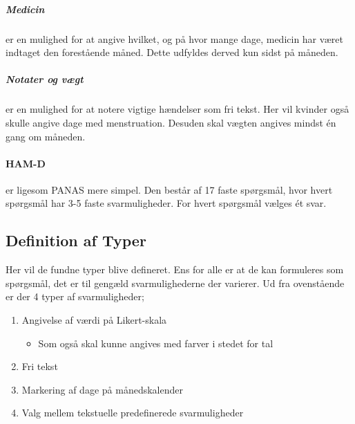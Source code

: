 \subparagraph{Medicin} er en mulighed for at angive hvilket, og på hvor mange dage, medicin har været indtaget den forestående måned.
Dette udfyldes derved kun sidst på måneden.

\subparagraph{Notater og vægt} er en mulighed for at notere vigtige hændelser som fri tekst.
Her vil kvinder også skulle angive dage med menstruation.
Desuden skal vægten angives mindst én gang om måneden.

\paragraph{HAM-D} er ligesom PANAS mere simpel.
Den består af 17 faste spørgsmål, hvor hvert spørgsmål har 3-5 faste svarmuligheder.
For hvert spørgsmål vælges ét svar.

\subsection{Definition af Typer}
Her vil de fundne typer blive defineret.
Ens for alle er at de kan formuleres som spørgsmål, det er til gengæld svarmulighederne der varierer.
Ud fra ovenstående er der 4 typer af svarmuligheder;

\begin{enumerate}
\item Angivelse af værdi på Likert-skala
\begin{itemize}
\item Som også skal kunne angives med farver i stedet for tal
\end{itemize}
\item Fri tekst
\item Markering af dage på månedskalender
\item Valg mellem tekstuelle predefinerede svarmuligheder
\end{enumerate}

